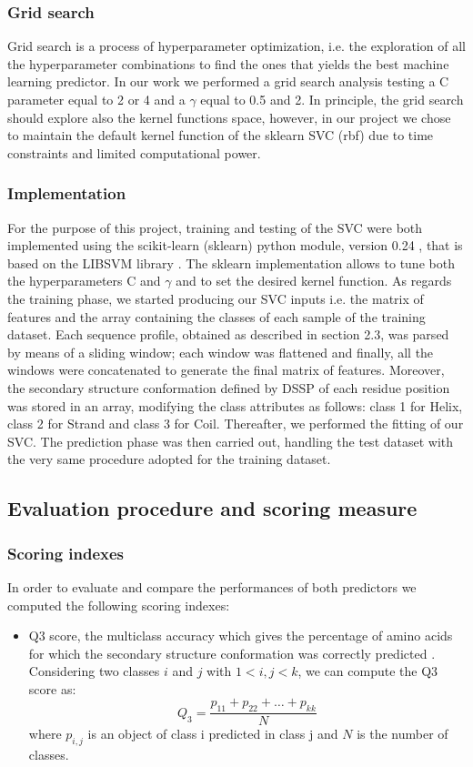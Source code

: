 \documentclass[nocrop]{bioinfo}
\begin{document}
\begin{methods}
\subsubsection{Grid search}
Grid search is a process of hyperparameter optimization, i.e. the exploration of all the hyperparameter combinations to find the ones that yields the best machine learning predictor. In our work we performed a grid search analysis testing a C parameter equal to 2 or 4 and a $\gamma$ equal to 0.5 and 2. In principle, the grid search should explore also the kernel functions space, however, in our project we chose to maintain the default kernel function of the sklearn SVC (rbf) due to time constraints and limited computational power. 

\subsubsection{Implementation}
For the purpose of this project, training and testing of the SVC were both implemented using the scikit-learn (sklearn) python module, version 0.24 \citep{pedregosa2011scikit}, that is based on the LIBSVM library  \citep{chang2011libsvm}. The sklearn implementation allows to tune both the hyperparameters C and $\gamma$ and to set the desired kernel function. 
As regards the training phase, we started producing our SVC inputs i.e. the matrix of features and the array containing the classes of each sample of the training dataset. Each sequence profile, obtained as described in section 2.3, was parsed by means of a sliding window; each window was flattened and finally, all the windows were concatenated to generate the final matrix of features. Moreover, the secondary structure conformation defined by DSSP of each residue position was stored in an array, modifying the class attributes as follows: class 1 for Helix, class 2 for Strand and class 3 for Coil. Thereafter, we performed the fitting of our SVC. 
The prediction phase was then carried out, handling the test dataset with the very same procedure adopted for the training dataset. 

\subsection{Evaluation procedure and scoring measure}
\subsubsection{Scoring indexes}
In order to evaluate and compare the performances of both predictors we computed the following scoring indexes:
\begin{itemize}
\item Q3 score, the multiclass accuracy which  gives the percentage of amino acids for which the secondary structure conformation was correctly predicted \citep{spencer2014deep}. Considering two classes $i$ and $j$ with $1 < i,j < k$, we can compute the Q3 score as:
\begin{equation}
Q_3  = \frac{p_{11}+p_{22}+\dots+p_{kk}}{N}
\end{equation}
where $p_{i,j}$ is an object of class i predicted in class j and $N$ is the number of classes.


\end{itemize}
\end{methods}
\end{document}

